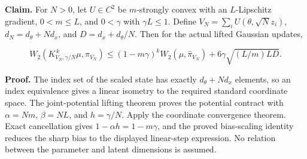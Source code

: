 \documentclass[11pt,a4paper]{report}
\begin{document}
\textbf{Claim.} For \(N>0\), let \(U\in C^2\) be \(m\)-strongly convex with an \(L\)-Lipschitz gradient, \(0<m\le L\), and \(0<\gamma\) with \(\gamma L\le1\). Define \(V_N=\sum_iU(\theta,\sqrt N z_i)\), \(d_N=d_\theta+Nd_x\), and \(D=d_x+d_\theta/N\). Then for the actual lifted Gaussian updates,

\[W_2(K_{V_N,\gamma/N}^{\,k}\mu,\pi_{V_N})\le(1-m\gamma)^kW_2(\mu,\widehat\pi_{V_N})+6\gamma\sqrt{(L/m)LD}.\]


\textbf{Proof.} The index set of the scaled state has exactly \(d_\theta+Nd_x\) elements, so an index equivalence gives a linear isometry to the required standard coordinate space. The joint-potential lifting theorem proves the potential contract with \(\alpha=Nm\), \(\beta=NL\), and \(h=\gamma/N\). Apply the coordinate convergence theorem. Exact cancellation gives \(1-\alpha h=1-m\gamma\), and the proved bias-scaling identity reduces the sharp bias to the displayed linear-step expression. No relation between the parameter and latent dimensions is assumed.
\end{document}
